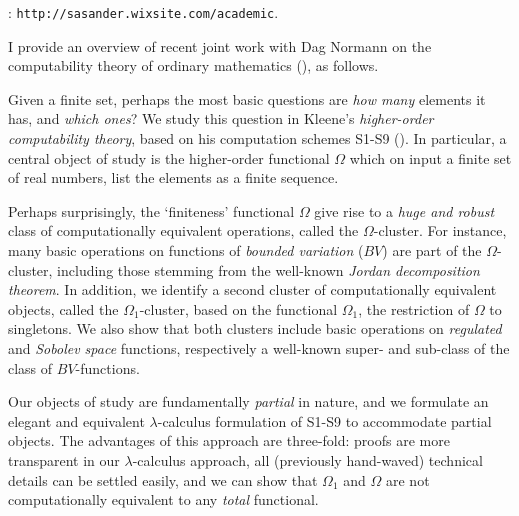 \documentclass[bsl,meeting,11pt]{asl}
\def\urladdr#1{\endgraf\noindent{\it URL Address}: {\tt #1}.}
\newcommand{\NP}{}
\begin{document}
\thispagestyle{empty}



\NP  
{}
\urladdr{http://sasander.wixsite.com/academic}



\medskip


I provide an overview of recent joint work with Dag Normann on the computability theory of ordinary mathematics (\cites{dagsamXII, dagsamXIII}), as follows.

\smallskip

Given a finite set, perhaps the most basic questions are \emph{how many} elements it has, and \emph{which ones}?  
We study this question in Kleene's \emph{higher-order computability theory}, based on his computation schemes S1-S9 (\cite{longmann}).  
In particular, a central object of study is the higher-order functional $\Omega$ which on input a finite set of real numbers, list the elements as a finite sequence. 

\smallskip

Perhaps surprisingly, the `finiteness' functional $\Omega$ give rise to a \emph{huge and robust} class of computationally equivalent operations, called the $\Omega$-cluster.
For instance, many basic operations on functions of \emph{bounded variation} ($BV$) are part of the $\Omega$-cluster, including those stemming from the well-known \emph{Jordan decomposition theorem}.  
In addition, we identify a second cluster of computationally equivalent objects, called the $\Omega_{1}$-cluster, based on the functional $\Omega_{1}$, the restriction of $\Omega$ to singletons.  
We also show that both clusters include basic operations on \emph{regulated} and \emph{Sobolev space} functions, respectively a well-known super- and sub-class of the class of $BV$-functions. 

\smallskip

Our objects of study are fundamentally \emph{partial} in nature, and we formulate an elegant and equivalent $\lambda$-calculus formulation of S1-S9 to accommodate partial objects.
The advantages of this approach are three-fold: proofs are more transparent in our $\lambda$-calculus approach, all (previously hand-waved) technical details can be settled easily, and we can show that $\Omega_{1}$ and $\Omega$ are not computationally equivalent to any \emph{total} functional.
\end{document}
